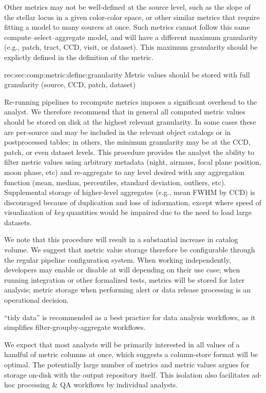 Other metrics may not be well-defined at the source level, such as the slope of the stellar locus in a given color-color space, or other similar metrics that require fitting a model to many sources at once.
Such metrics cannot follow this same compute--select--aggregate model, and will have a different maximum granularity (e.g., patch, tract, CCD, visit, or dataset).
This maximum granularity should be explictly defined in the definition of the metric.

\begin{recommendation}
    {rec:sec:comp:metric:define:granularity}
    {Metric values should be stored with full granularity (source, CCD, patch, dataset)}
\end{recommendation}

Re-running pipelines to recompute metrics imposes a significant overhead to the analyst.
We therefore recommend that in general all computed metric values should be stored on disk at the highest relevant granularity.
In some cases these are per-source and may be included in the relevant object catalogs or in postprocessed tables; in others, the minimum granularity may be at the CCD, patch, or even dataset levels.
This procedure provides the analyst the ability to filter metric values using arbitrary metadata (night, airmass, focal plane position, moon phase, etc) and re-aggregate to any level desired with any aggregation function (mean, median, percentiles, standard deviation, outliers, etc).
Supplemental storage of higher-level aggregates (e.g., mean FWHM by CCD) is discouraged because of duplication and loss of information, except where speed of visualization of \emph{key} quantities would be impaired due to the need to load large datasets.

We note that this procedure will result in a substantial increase in catalog volume.
We suggest that metric value storage therefore be configurable through the regular pipeline configuration system.
When working independently, developers may enable or disable at will depending on their use case; when running integration or other formalized tests, metrics will be stored for later analysis; metric storage when performing alert or data release processing is an operational decision.

``\Gls{tidy data}'' is recommended as a best practice for data analysis workflows, as it simplifies filter-groupby-aggregate workflows.

We expect that most analysts will be primarily interested in all values of a handful of metric columns at once, which suggests a column-store format will be optimal.
The potentially large number of metrics and metric values argues for storage on-disk with the output repository itself.
This isolation also facilitates ad-hoc processing \& QA workflows by individual analysts.

